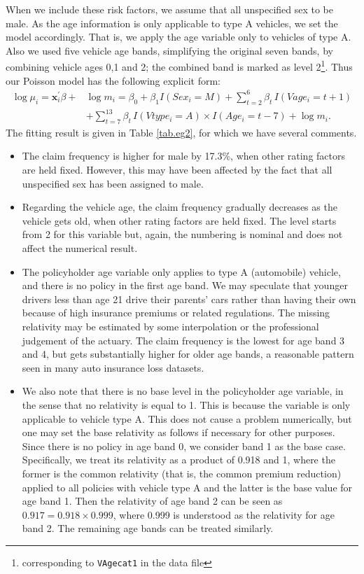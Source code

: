 \documentclass[12pt]{article}
\begin{document}
When we include these risk factors, we assume that all unspecified sex to be male. As the age information is only applicable to type A vehicles, we set the model accordingly. That is, we apply the age variable only to vehicles of type A.  Also we used five vehicle age bands, simplifying the original seven bands, by combining vehicle ages 0,1 and 2; the combined band is marked as level 2\footnote{corresponding to \texttt{VAgecat1} in the data file}. Thus our Poisson model has the following explicit form:
\begin{align*}
\label{eg2.setup}
\log \mu_i= \mathbf{ x}^{\prime}_i\beta+&\log m_i=\beta_0+\beta_1 I(Sex_i=M)+ \sum_{t=2}^6 \beta_t\, I(Vage_i=t+1) \\
&+  \sum_{t=7}^{13} \beta_t \,I(Vtype_i=A)\times I(Age_i=t-7)+\log m_i.
\end{align*}
The fitting result is given in Table \ref{tab.eg2}, for which we have several comments.  
\begin{itemize}
  \item The claim frequency is higher for male by 17.3\%, when other rating factors are held fixed. However, this may have been affected by the fact that all unspecified sex has been assigned to male.
  \item Regarding the vehicle age, the claim frequency gradually decreases as the vehicle gets old, when other rating factors are held fixed. The level starts from 2 for this variable but, again, the numbering is nominal and does not affect the numerical result.
  \item The policyholder age variable only applies to type A (automobile) vehicle, and there is no policy in the first age band. We may speculate that younger drivers less than age 21 drive their parents' cars rather than having their own because of high insurance premiums or related regulations. The missing relativity may be estimated by some interpolation or the professional judgement of the actuary. The claim frequency is the lowest for age band 3 and 4, but gets substantially higher for older age bands, a reasonable pattern seen in many auto insurance loss datasets. 
  \item We also note that there is no base level in the policyholder age variable, in the sense that no relativity is equal to 1. This is because the variable is only applicable to vehicle type A. This does not cause a problem numerically, but one may set the base relativity as follows if necessary for other purposes. Since there is no policy in age band 0, we consider band 1 as the base case. Specifically, we treat its relativity as a product of 0.918 and 1, where the former is the common relativity (that is, the common premium reduction) applied to all policies with vehicle type A and the latter is the base value for age band 1. Then the relativity of age band 2 can be seen as $0.917=0.918 \times 0.999$, where 0.999 is understood as  the relativity for age band 2. The remaining age bands can be treated similarly. 
  
\end{itemize}
\end{document}
